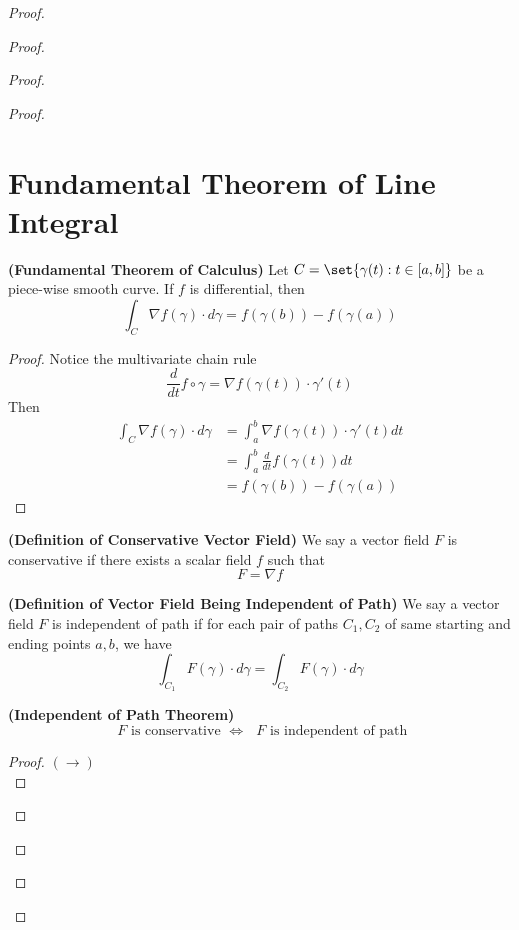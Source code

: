 \documentclass{report}
\begin{document}
\begin{proof}
\begin{proof}
\begin{proof}
\begin{proof}
\section{Fundamental Theorem of Line Integral}
\begin{theorem}
\label{9.2.1}
\textbf{(Fundamental Theorem of Calculus)} Let $C=\set{\gamma (t):t\in [a,b]}$ be a piece-wise smooth curve. If $f$ is differential, then
 \begin{equation}
\int_C \nabla f(\gamma )\cdot d\gamma =f(\gamma (b))-f(\gamma (a))
\end{equation}
\end{theorem}
\begin{proof}
Notice the multivariate chain rule
\begin{equation}
\frac{d}{dt} f\circ \gamma =\nabla f(\gamma (t)) \cdot \gamma '(t)
\end{equation}
Then
\begin{align}
\int_C \nabla f(\gamma )\cdot d\gamma &=\int_a^b \nabla f(\gamma (t))\cdot \gamma '(t)dt\\
&=\int_a^b \frac{d}{dt}f(\gamma (t))dt\\
&=f(\gamma (b))-f(\gamma (a))
\end{align}
\end{proof}
\begin{definition}
\label{9.2.2}
\textbf{(Definition of Conservative Vector Field)} We say a vector field $F$ is conservative if there exists  a scalar field  $f$ such that
 \begin{equation}
F=\nabla f
\end{equation}
\end{definition}
\begin{definition}
\label{9.2.3}
\textbf{(Definition of Vector Field Being Independent of Path)} We say a vector field $F$ is independent of path if for each pair of paths $C_1,C_2$ of same starting and ending points $a,b$, we have
\begin{equation}
\int_{C_1} F(\gamma )\cdot d\gamma =\int_{C_2}F(\gamma )\cdot d\gamma 
\end{equation}
\end{definition}
\begin{theorem}
\label{9.2.4}
\textbf{(Independent of Path Theorem)} 
\begin{equation}
\text{ $F$ is conservative }\iff \text{ $F$ is independent of path }
\end{equation}
\end{theorem}
\begin{proof}
$(\longrightarrow)$\\


\end{proof}
\end{proof}
\end{proof}
\end{proof}
\end{proof}
\end{document}
